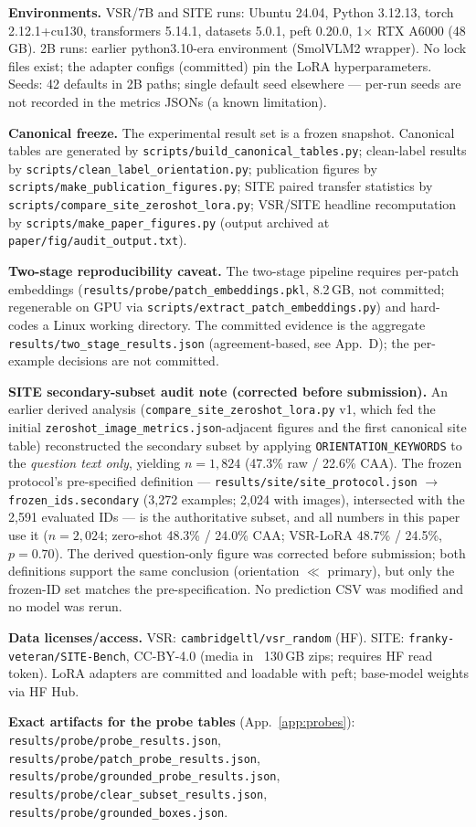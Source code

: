 \textbf{Environments.} VSR/7B and SITE runs: Ubuntu 24.04, Python 3.12.13,
torch 2.12.1+cu130, transformers 5.14.1, datasets 5.0.1, peft 0.20.0, 1$\times$
RTX A6000 (48\,GB). 2B runs: earlier python3.10-era environment (SmolVLM2
wrapper). No lock files exist; the adapter configs (committed) pin the LoRA
hyperparameters. Seeds: 42 defaults in 2B paths; single default seed elsewhere
--- per-run seeds are not recorded in the metrics JSONs (a known limitation).

\textbf{Canonical freeze.} The experimental result set is a frozen snapshot. Canonical tables are generated by
\texttt{scripts/build\_canonical\_tables.py}; clean-label results by
\texttt{scripts/clean\_label\_orientation.py}; publication figures by
\texttt{scripts/make\_publication\_figures.py}; SITE paired transfer statistics
by \texttt{scripts/compare\_site\_zeroshot\_lora.py}; VSR/SITE headline
recomputation by \texttt{scripts/make\_paper\_figures.py} (output archived at
\texttt{paper/fig/audit\_output.txt}).

\textbf{Two-stage reproducibility caveat.} The two-stage pipeline requires
per-patch embeddings (\texttt{results/probe/patch\_embeddings.pkl}, 8.2\,GB,
not committed; regenerable on GPU via
\texttt{scripts/extract\_patch\_embeddings.py}) and hard-codes a Linux working
directory. The committed evidence is the aggregate
\texttt{results/two\_stage\_results.json} (agreement-based, see App.~D); the
per-example decisions are not committed.

\textbf{SITE secondary-subset audit note (corrected before submission).} An
earlier derived analysis (\texttt{compare\_site\_zeroshot\_lora.py} v1, which
fed the initial \texttt{zeroshot\_image\_metrics.json}-adjacent figures and the
first canonical site table) reconstructed the secondary subset by applying
\verb|ORIENTATION_KEYWORDS| to the \emph{question text only}, yielding
$n{=}1{,}824$ (47.3\% raw / 22.6\% CAA). The frozen protocol's pre-specified
definition --- \texttt{results/site/site\_protocol.json}
$\rightarrow$ \texttt{frozen\_ids.secondary} (3{,}272 examples; 2{,}024 with
images), intersected with the 2{,}591 evaluated IDs --- is the authoritative
subset, and all numbers in this paper use it ($n{=}2{,}024$; zero-shot 48.3\% /
24.0\% CAA; VSR-LoRA 48.7\% / 24.5\%, $p{=}0.70$). The derived question-only
figure was corrected before submission; both definitions support the same
conclusion (orientation $\ll$ primary), but only the frozen-ID set matches the
pre-specification. No prediction CSV was modified and no model was rerun.

\textbf{Data licenses/access.} VSR: \texttt{cambridgeltl/vsr\_random} (HF).
SITE: \texttt{franky-veteran/SITE-Bench}, CC-BY-4.0 (media in ~130\,GB zips;
requires HF read token). LoRA adapters are committed and loadable with peft;
base-model weights via HF Hub.

\textbf{Exact artifacts for the probe tables} (App.~\ref{app:probes}):
\texttt{results/probe/probe\_results.json},
\texttt{results/probe/patch\_probe\_results.json},
\texttt{results/probe/grounded\_probe\_results.json},
\texttt{results/probe/clear\_subset\_results.json},
\texttt{results/probe/grounded\_boxes.json}.
